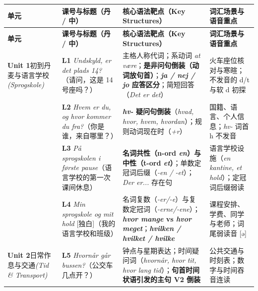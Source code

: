 \documentclass[10.5pt, a4paper]{ctexart}
\begin{document}
{\small
\renewcommand{\arraystretch}{1.28}
\begin{longtable}{@{} >{\raggedright\arraybackslash}p{2.65cm} >{\raggedright\arraybackslash}p{4.6cm} >{\raggedright\arraybackslash}p{5.15cm} >{\raggedright\arraybackslash}p{3.2cm} @{}}
\toprule
\textbf{单元} & \textbf{课号与标题（丹 / 中）} & \textbf{核心语法靶点（Key Structures）} & \textbf{词汇场景与语音重点} \\
\midrule
\endfirsthead
\toprule
\textbf{单元} & \textbf{课号与标题（丹 / 中）} & \textbf{核心语法靶点（Key Structures）} & \textbf{词汇场景与语音重点} \\
\midrule
\endhead
\bottomrule
\endfoot
\textbf{Unit 1}\newline 初到丹麦与\newline 语言学校\newline \textit{(Sprogskole)} & \textbf{L1} \textit{Undskyld, er det plads 14?}\newline （请问，这是 14 号座吗？） & 主格人称代词；系动词 \textit{at være}；\textbf{是非问句倒装（动词放句首）}；\textbf{\textit{ja / nej / jo} 应答区分}；简短回答（\textit{Det er det}） & 火车座位核对与寒暄；不发音的 d/t 与软 d 初探 \\
 & \textbf{L2} \textit{Hvem er du, og hvor kommer du fra?}\newline （你是谁，来自哪里？） & \textbf{\textit{hv-} 疑问句倒装}（\textit{hvad, hvor, hvem, hvordan}）；规则动词现在时（\textit{+r}） & 国籍、语言、个人信息；\textit{hv-} 词首 h 不发音 \\
 & \textbf{L3} \textit{På sprogskolen i første pause}\newline （语言学校的第一次课间休息） & \textbf{名词共性（n-ord \textit{en}）与中性（t-ord \textit{et}）}；单数定冠词后缀（\textit{-en / -et}）；\textit{Der er...} 存在句 & 语言学校设施（\textit{en kantine, et hold}）；定冠词后缀弱读 \\
 & \textbf{L4} \textit{Min sprogskole og mit hold} [独白]\newline （我的语言学校和班级） & 名词复数（\textit{-er/-e}）与复数定冠词（\textit{-erne/-ene}）；\textbf{\textit{hvor mange} vs \textit{hvor meget}}；\textbf{\textit{hvilken / hvilket / hvilke}} & 课程安排、学费、同学与老师；词尾弱读音 [ə] \\
\midrule
\textbf{Unit 2}\newline 日常作息与交通\newline \textit{(Tid \& Transport)} & \textbf{L5} \textit{Hvornår går bussen?}\newline （公交车几点开？） & 钟点与星期表达；时间疑问词（\textit{hvornår, hvor tit, hvor lang tid}）；\textbf{句首时间状语引发的主句 V2 倒装} & 公共交通与时刻表；数字与时间吞音连读 \\

\end{longtable}}
\end{document}
